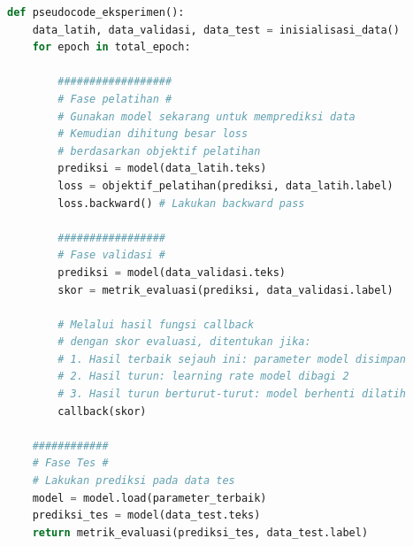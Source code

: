 \begin{lstlisting}[language=Python]
def pseudocode_eksperimen():
    data_latih, data_validasi, data_test = inisialisasi_data()
    for epoch in total_epoch:

        ##################
        # Fase pelatihan #
        # Gunakan model sekarang untuk memprediksi data
        # Kemudian dihitung besar loss 
        # berdasarkan objektif pelatihan
        prediksi = model(data_latih.teks)
        loss = objektif_pelatihan(prediksi, data_latih.label)
        loss.backward() # Lakukan backward pass

        #################
        # Fase validasi #
        prediksi = model(data_validasi.teks)
        skor = metrik_evaluasi(prediksi, data_validasi.label)
        
        # Melalui hasil fungsi callback 
        # dengan skor evaluasi, ditentukan jika:
        # 1. Hasil terbaik sejauh ini: parameter model disimpan
        # 2. Hasil turun: learning rate model dibagi 2
        # 3. Hasil turun berturut-turut: model berhenti dilatih
        callback(skor)

    ############
    # Fase Tes #
    # Lakukan prediksi pada data tes
    model = model.load(parameter_terbaik)
    prediksi_tes = model(data_test.teks)
    return metrik_evaluasi(prediksi_tes, data_test.label)
\end{lstlisting}


